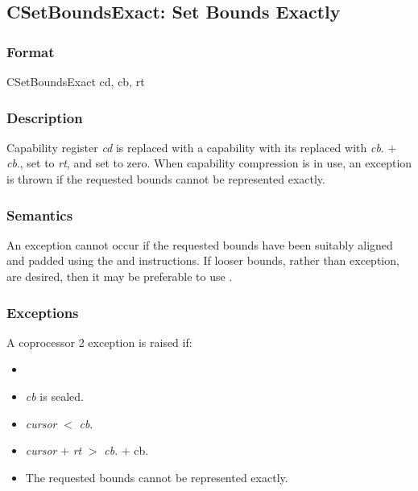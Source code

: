 \clearpage
{}
{}
\subsection*{CSetBoundsExact: Set Bounds Exactly}

\subsubsection*{Format}

CSetBoundsExact cd, cb, rt

\begin{center}
\end{center}

\subsubsection*{Description}

Capability register \emph{cd} is replaced with a capability with its \cbase{}
replaced with \emph{cb}.\cbase{} $+$ \emph{cb}.\coffset{}, \clength{} set to
\emph{rt}, and \coffset{} set to zero.
When capability compression is in use, an exception is thrown if the requested
bounds cannot be represented exactly.

\subsubsection*{Semantics}

An exception cannot occur if the requested bounds have been suitably aligned
and padded using the  and  instructions.
If looser bounds, rather than exception, are desired, then it may be
preferable to use .

\subsubsection*{Exceptions}

A coprocessor 2 exception is raised if:

\begin{itemize}
\item
\cchecktag{}
\item
\emph{cb} is sealed.
\item
\emph{cursor} $<$ \emph{cb}.\cbase{}
\item
\emph{cursor} $+$ \emph{rt} $>$ \emph{cb}.\cbase{} $+$ cb.\clength{}
\item
The requested bounds cannot be represented exactly.
\end{itemize}


